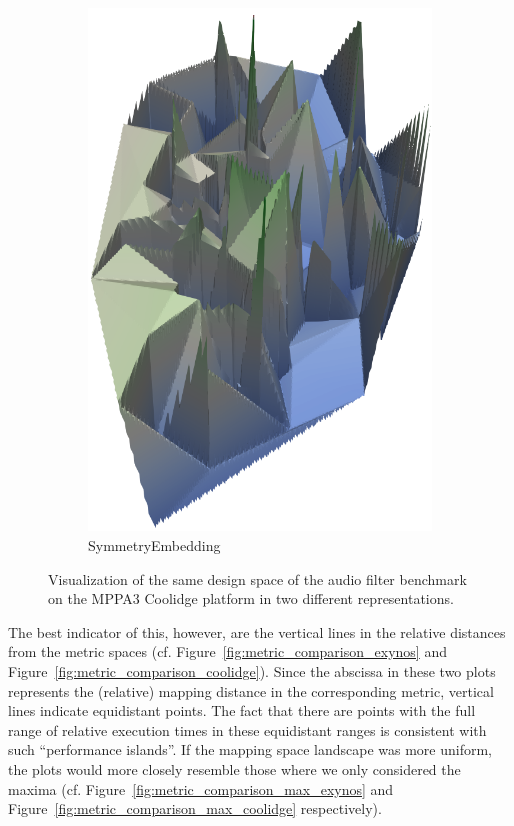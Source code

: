 \begin{figure}[t]
\begin{subfigure}[b]{0.43\textwidth}
    \includegraphics[width=\textwidth]{figures/coolidge-af-space-emb-sym.png}
		\caption{SymmetryEmbedding}
	\end{subfigure}

	\caption{Visualization of the same design space of the audio filter benchmark on the MPPA3 Coolidge platform in two different representations.}%
	\label{fig:visualization_simpvec_symemb}
\end{figure}


The best indicator of this, however, are the vertical lines in the relative distances from the metric spaces (cf. Figure~\ref{fig:metric_comparison_exynos} and Figure~\ref{fig:metric_comparison_coolidge}).
Since the abscissa in these two plots represents the (relative) mapping distance in the corresponding metric, vertical lines indicate equidistant points. 
The fact that there are points with the full range of relative execution times in these equidistant ranges is consistent with such ``performance islands''.
If the mapping space landscape was more uniform, the plots would more closely resemble those where we only considered the maxima (cf. Figure~\ref{fig:metric_comparison_max_exynos} and Figure~\ref{fig:metric_comparison_max_coolidge} respectively).

